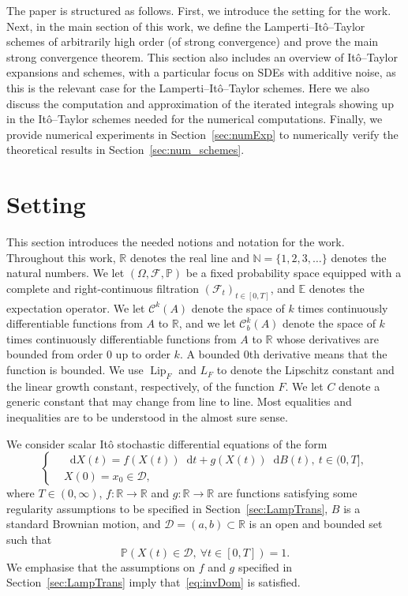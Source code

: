 \documentclass[11pt]{amsart}
\newcommand{\E}{{\mathbb E}}
\newcommand{\PP}{{\mathbb P}}
\newcommand*\diff{\mathop{}\!\mathrm{d}}
\newcommand{\D}{\mathcal{D}}
\newcommand{\C}{\mathcal{C}}
\newcommand{\Lip}{\operatorname{Lip}}
\begin{document}
{The paper is structured as follows. First, we introduce the setting for the work. Next, in the main section of this work, we define the Lamperti--Itô--Taylor schemes of arbitrarily high order (of strong convergence) and prove the main strong convergence theorem. This section also includes an overview of Itô--Taylor expansions and schemes, with a particular focus on SDEs with additive noise, as this is the relevant case for the Lamperti--Itô--Taylor schemes. Here we also discuss the computation and approximation of the iterated integrals showing up in the Itô--Taylor schemes needed for the numerical computations. Finally, we provide numerical experiments in Section~\ref{sec:numExp} to numerically verify the theoretical results in Section~\ref{sec:num_schemes}.

\section{Setting}\label{sec:setting}
This section introduces the needed notions and notation for the work. Throughout this work, $\mathbb{R}$ denotes the real line and $\mathbb{N} = \{ 1,2,3,\ldots \}$ denotes the natural numbers. We let $(\Omega, \mathcal{F}, \mathbb{P})$ be a fixed probability space equipped with a complete and right-continuous filtration $\left( \mathcal{F}_{t} \right)_{t \in [0, T]}$, and $\E$ denotes the expectation operator. We let $\C^{k}(A)$ denote the space of $k$ times continuously differentiable functions from $A$ to $\mathbb{R}$, and we let $\C_{b}^{k}(A)$ denote the space of $k$ times continuously differentiable functions from $A$ to $\mathbb{R}$ whose derivatives are bounded from order $0$ up to order $k$. A bounded $0$th derivative means that the function is bounded. We use $\Lip_{F}$ and $L_{F}$ to denote the Lipschitz constant and the linear growth constant, respectively, of the function $F$. We let $C$ denote a generic constant that may change from line to line. Most equalities and inequalities are to be understood in the almost sure sense.

We consider scalar Itô stochastic differential equations of the form
\begin{equation}\label{eq:SDE}
\left\lbrace
\begin{aligned}
& \diff X(t) = f(X(t)) \diff t + g(X(t)) \diff B(t),\ t \in (0,T], \\ 
& X(0) = x_{0} \in \D,
\end{aligned}
\right.
\end{equation}
where $T \in (0,\infty)$, $f: \mathbb{R} \to \mathbb{R}$ and $g: \mathbb{R} \to \mathbb{R}$ are functions satisfying some regularity assumptions to be specified in Section~\ref{sec:LampTrans}, $B$ is a standard Brownian motion, and $\D = (a,b) \subset \mathbb{R}$ is an open and bounded set such that
\begin{equation}\label{eq:invDom}
\PP (X(t) \in \D,\ \forall t \in [0,T]) = 1.
\end{equation}
We emphasise that the assumptions on $f$ and $g$ specified in Section~\ref{sec:LampTrans} imply that~\eqref{eq:invDom} is satisfied.

}
\end{document}
